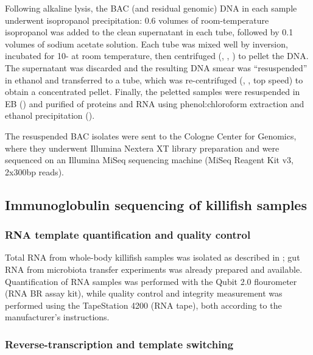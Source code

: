 Following alkaline lysis, the BAC (and residual genomic) DNA in each sample underwent isopropanol precipitation: 0.6 volumes of room-temperature isopropanol was added to the clean supernatant in each tube, followed by 0.1 volumes of  sodium acetate solution. Each tube was mixed well by inversion, incubated for 10- at room temperature, then centrifuged (, , ) to pellet the DNA. The supernatant was discarded and the resulting DNA smear was ``resuspended'' in   ethanol and transferred to a  tube, which was re-centrifuged (, , top speed) to obtain a concentrated pellet. Finally, the peletted samples were resuspended in EB () and purified of proteins and RNA using phenol:chloroform extraction and ethanol precipitation ().

The resuspended BAC isolates were sent to the Cologne Center for Genomics, where they underwent Illumina Nextera XT library preparation and were sequenced on an Illumina MiSeq sequencing machine (MiSeq Reagent Kit v3, 2x300bp reads).

\subsection{Immunoglobulin sequencing of killifish samples}
\label{sec:methods_molec_igseq}

\subsubsection{RNA template quantification and quality control}
\label{sec:methods_molec_igseq_template}

Total RNA from whole-body killifish samples was isolated as described in ; gut RNA from microbiota transfer experiments \parencite{smith2017microbiota} was already prepared and available. Quantification of RNA samples was performed with the Qubit 2.0 flourometer (RNA BR assay kit), while quality control and integrity measurement was performed using the TapeStation 4200 (RNA tape), both according to the manufacturer's instructions.

\subsubsection{Reverse-transcription and template switching}
\label{sec:methods_molec_igseq_rt}

